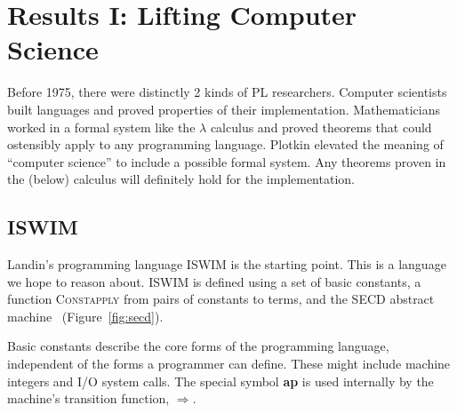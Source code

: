 \documentclass{article}
\begin{document}
\section{Results I: Lifting Computer Science}

Before 1975, there were distinctly 2 kinds of PL researchers.
Computer scientists built languages and proved properties of their implementation.
Mathematicians worked in a formal system like the $\lambda$ calculus and proved theorems that could ostensibly apply to any programming language.
Plotkin elevated the meaning of ``computer science'' to include a possible formal system.
Any theorems proven in the (below) calculus will definitely hold for the implementation.

\subsection{ISWIM}

Landin's programming language ISWIM is the starting point.
This is a language we hope to reason about.
ISWIM is defined using a set of basic constants, a function \textsc{Constapply} from pairs of constants to terms, and the SECD abstract machine~\cite{l-mechanical} (Figure~\ref{fig:secd}).

Basic constants describe the core forms of the programming language, independent of the forms a programmer can define.
These might include machine integers and I/O system calls.
The special symbol {\bf ap} is used internally by the machine's transition function, $\Rightarrow$.
\end{document}

